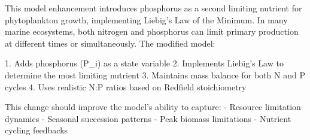 This model enhancement introduces phosphorus as a second limiting nutrient for phytoplankton growth, implementing Liebig's Law of the Minimum. In many marine ecosystems, both nitrogen and phosphorus can limit primary production at different times or simultaneously. The modified model:

1. Adds phosphorus (P_i) as a state variable
2. Implements Liebig's Law to determine the most limiting nutrient
3. Maintains mass balance for both N and P cycles
4. Uses realistic N:P ratios based on Redfield stoichiometry

This change should improve the model's ability to capture:
- Resource limitation dynamics
- Seasonal succession patterns
- Peak biomass limitations
- Nutrient cycling feedbacks
